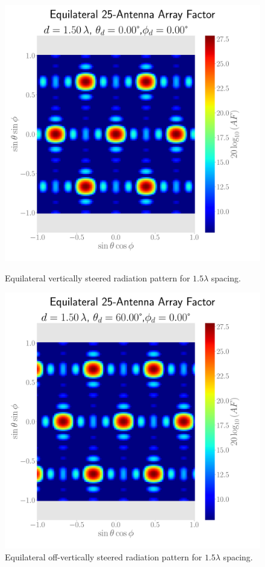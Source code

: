\begin{figure}[H]
  \begin{minipage}[t]{0.45\textwidth}
    \centering
    \includegraphics[width=\textwidth]{graphics/task_3/equilat-1.50-lambda-0.00-theta-0.00-phi-radpat.pdf}
    \caption{Equilateral vertically steered radiation pattern for $1.5\lambda$ spacing.}\label{fig:rad-equilat-1.5-0}
  \end{minipage}\hfill
  \begin{minipage}[t]{0.45\textwidth}
    \centering
    \includegraphics[width=\textwidth]{graphics/task_3/equilat-1.50-lambda-60.00-theta-0.00-phi-radpat.pdf}
    \caption{Equilateral off-vertically steered radiation pattern for $1.5\lambda$ spacing.}\label{fig:rad-equilat-1.5-60}
   \end{minipage}
\end{figure}


